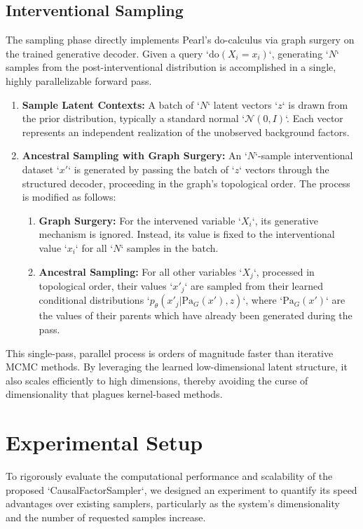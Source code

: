\documentclass{article} %
\begin{document}
\subsection{Interventional Sampling}

The sampling phase directly implements Pearl's do-calculus via graph surgery on the trained generative decoder. Given a query `$\mathrm{do}(X_i = x_i)$`, generating `$N$` samples from the post-interventional distribution is accomplished in a single, highly parallelizable forward pass.

\begin{enumerate}
\item[a.] \textbf{Sample Latent Contexts:} A batch of `$N$` latent vectors `$z$` is drawn from the prior distribution, typically a standard normal `$\mathcal{N}(0, I)$`. Each vector represents an independent realization of the unobserved background factors.
\item[b.] \textbf{Ancestral Sampling with Graph Surgery:} An `$N$`-sample interventional dataset `$x'$` is generated by passing the batch of `$z$` vectors through the structured decoder, proceeding in the graph's topological order. The process is modified as follows:
    \begin{enumerate}
    \item[i.] \textbf{Graph Surgery:} For the intervened variable `$X_i$`, its generative mechanism is ignored. Instead, its value is fixed to the interventional value `$x_i$` for all `$N$` samples in the batch.
    \item[ii.] \textbf{Ancestral Sampling:} For all other variables `$X_j$`, processed in topological order, their values `$x'_j$` are sampled from their learned conditional distributions `$p_\theta(x'_j | \mathrm{Pa}_G(x'), z)$`, where `$\mathrm{Pa}_G(x')$` are the values of their parents which have already been generated during the pass.
    \end{enumerate}
\end{enumerate}

This single-pass, parallel process is orders of magnitude faster than iterative MCMC methods. By leveraging the learned low-dimensional latent structure, it also scales efficiently to high dimensions, thereby avoiding the curse of dimensionality that plagues kernel-based methods.

\section{Experimental Setup}
\label{sec:experimental}
To rigorously evaluate the computational performance and scalability of the proposed `CausalFactorSampler`, we designed an experiment to quantify its speed advantages over existing samplers, particularly as the system's dimensionality and the number of requested samples increase.
\end{document}
